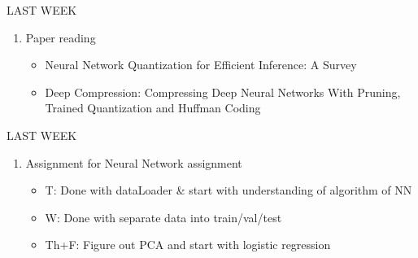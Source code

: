 \begin{frame}{LAST WEEK}
    \begin{enumerate}
        \item Paper reading
        \begin{itemize}
            \item Neural Network Quantization for Efficient Inference: A Survey
            \item Deep Compression: Compressing Deep Neural Networks With Pruning, Trained Quantization and Huffman Coding
        \end{itemize}
    \end{enumerate}
\end{frame}

\begin{frame}{LAST WEEK}
    \begin{enumerate}
        \item Assignment for Neural Network assignment
        \begin{itemize}
            \item T: Done with dataLoader & start with understanding of algorithm of NN
            \item W: Done with separate data into train/val/test
            \item Th+F: Figure out PCA and start with logistic regression
        \end{itemize}
    \end{enumerate}
\end{frame}

